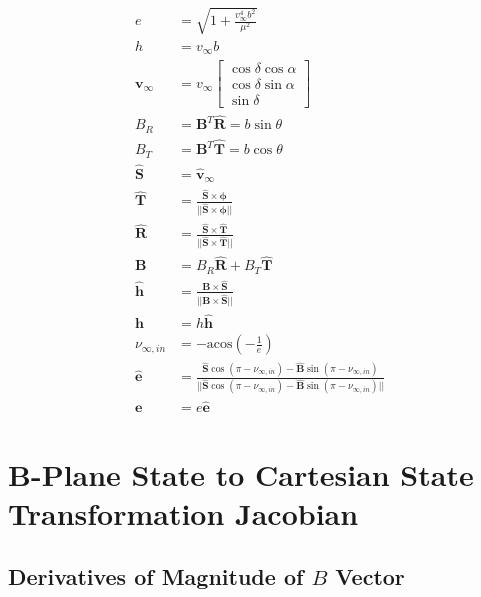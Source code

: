 \documentclass[]{article}
\newcommand{\vb}[1]{\bm{#1}} %
\newcommand{\vbh}[1]{\hat{\bm{#1}}} %
\begin{document}
\begin{align}
	e &= \sqrt{1 + \frac{v_{\infty}^4 b^2}{\mu^2}} \\
	h &= v_{\infty} b \\
	\vb{v}_{\infty} &= v_{\infty} \left[ \begin{array}{c}
	\cos{\delta} \cos{\alpha} \\
	\cos{\delta} \sin{\alpha} \\
	\sin{\delta}
	\end{array} \right] \\
	B_R &= \vb{B}^T \vbh{R} = b \sin{\theta} \\
	B_T &= \vb{B}^T \vbh{T} = b \cos{\theta} \\
	\vbh{S} &= \vbh{v}_{\infty} \\
	\vbh{T} &= \frac{\vbh{S} \times \vb{\phi}}{||\vbh{S} \times \vb{\phi}||} \\
	\vbh{R} &= \frac{\vbh{S} \times \vbh{T}}{||\vbh{S} \times \vbh{T}||} \\
	\vb{B} &= B_R \vbh{R} + B_T \vbh{T} \\
	\vbh{h} &= \frac{\vb{B} \times \vbh{S}}{||\vb{B} \times \vbh{S}||} \\
	\vb{h} &= h \vbh{h} \\
	\nu_{\infty, in} &= - \mathrm{acos} \left( - \frac{1}{e} \right) \\
	\label{eq:ehat_in}
	\vbh{e} &= \frac{\vbh{S} \cos \left(\pi - \nu_{\infty, in} \right) - \vbh{B} \sin \left(\pi - \nu_{\infty, in} \right)}{||\vbh{S} \cos \left(\pi - \nu_{\infty, in} \right) - \vbh{B} \sin \left(\pi - \nu_{\infty, in} \right)||} \\
	\vb{e} &= e \vbh{e}
\end{align}


\section{B-Plane State to Cartesian State Transformation Jacobian}
\label{sec:bplane2cartesianjac}

\subsection{Derivatives of Magnitude of $B$ Vector}
\end{document}
